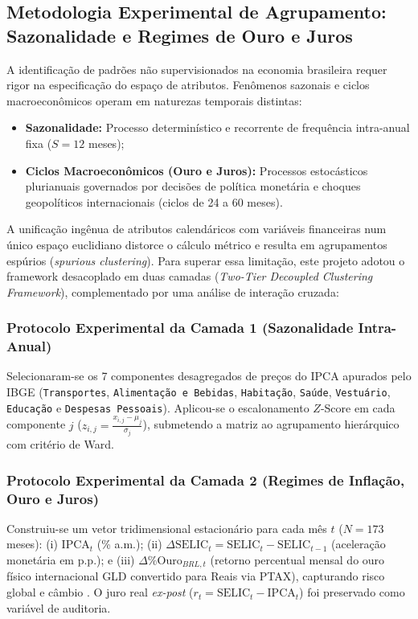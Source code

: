 \documentclass[10pt,twoside]{article}
\begin{document}
\subsection{Metodologia Experimental de Agrupamento: Sazonalidade e Regimes de Ouro e Juros}
A identificação de padrões não supervisionados na economia brasileira requer rigor na especificação do espaço de atributos. Fenômenos sazonais e ciclos macroeconômicos operam em naturezas temporais distintas:
\begin{itemize}
    \item \textbf{Sazonalidade:} Processo determinístico e recorrente de frequência intra-anual fixa ($S = 12$ meses);
    \item \textbf{Ciclos Macroeconômicos (Ouro e Juros):} Processos estocásticos plurianuais governados por decisões de política monetária e choques geopolíticos internacionais (ciclos de 24 a 60 meses).
\end{itemize}

A unificação ingênua de atributos calendáricos com variáveis financeiras num único espaço euclidiano distorce o cálculo métrico e resulta em agrupamentos espúrios (\textit{spurious clustering}). Para superar essa limitação, este projeto adotou o framework desacoplado em duas camadas (\textit{Two-Tier Decoupled Clustering Framework}), complementado por uma análise de interação cruzada:

\subsubsection{Protocolo Experimental da Camada 1 (Sazonalidade Intra-Anual)}
Selecionaram-se os 7 componentes desagregados de preços do IPCA apurados pelo IBGE (\texttt{Transportes}, \texttt{Alimentação e Bebidas}, \texttt{Habitação}, \texttt{Saúde}, \texttt{Vestuário}, \texttt{Educação} e \texttt{Despesas Pessoais}). Aplicou-se o escalonamento $Z$-Score em cada componente $j$ ($z_{i,j} = \frac{x_{i,j} - \mu_j}{\sigma_j}$), submetendo a matriz ao agrupamento hierárquico com critério de Ward.

\subsubsection{Protocolo Experimental da Camada 2 (Regimes de Inflação, Ouro e Juros)}
Construiu-se um vetor tridimensional estacionário para cada mês $t$ ($N = 173$ meses): (i) $\text{IPCA}_t$ (\% a.m.); (ii) $\Delta \text{SELIC}_t = \text{SELIC}_t - \text{SELIC}_{t-1}$ (aceleração monetária em p.p.); e (iii) $\Delta \% \text{Ouro}_{BRL,t}$ (retorno percentual mensal do ouro físico internacional GLD convertido para Reais via PTAX), capturando risco global e câmbio \cite{ref21, ref22}. O juro real \textit{ex-post} ($r_t = \text{SELIC}_t - \text{IPCA}_t$) foi preservado como variável de auditoria.
\end{document}
